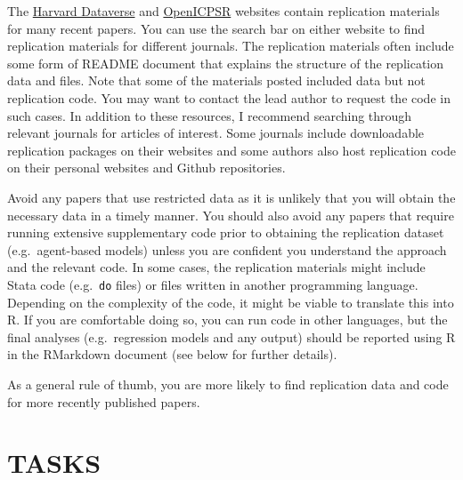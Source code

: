 \documentclass[
  12pt,
]{article}
\begin{document}
The \href{https://dataverse.harvard.edu/}{Harvard Dataverse} and
\href{https://www.openicpsr.org/openicpsr/search/studies#}{OpenICPSR}
websites contain replication materials for many recent papers. You can
use the search bar on either website to find replication materials for
different journals. The replication materials often include some form of
README document that explains the structure of the replication data and
files. Note that some of the materials posted included data but not
replication code. You may want to contact the lead author to request the
code in such cases. In addition to these resources, I recommend
searching through relevant journals for articles of interest. Some
journals include downloadable replication packages on their websites and
some authors also host replication code on their personal websites and
Github repositories.

Avoid any papers that use restricted data as it is unlikely that you
will obtain the necessary data in a timely manner. You should also avoid
any papers that require running extensive supplementary code prior to
obtaining the replication dataset (e.g.~agent-based models) unless you
are confident you understand the approach and the relevant code. In some
cases, the replication materials might include Stata code
(e.g.~\texttt{do} files) or files written in another programming
language. Depending on the complexity of the code, it might be viable to
translate this into R. If you are comfortable doing so, you can run code
in other languages, but the final analyses (e.g.~regression models and
any output) should be reported using R in the RMarkdown document (see
below for further details).

As a general rule of thumb, you are more likely to find replication data
and code for more recently published papers.

\hypertarget{tasks}{%
\section{TASKS}\label{tasks}}
\end{document}
